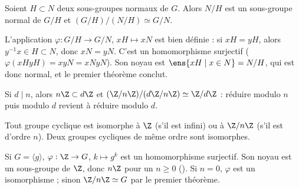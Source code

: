 \begin{theoreme}\label{thm-iso3}
Soient $H\subset N$ deux sous-groupes normaux de $G$. Alors $N/H$ est un sous-groupe normal de $G/H$ et $(G/H)/(N/H)\simeq G/N$.
\end{theoreme}
\begin{preuve}
L'application $\varphi:G/H\to G/N$, $xH\mapsto xN$ est bien définie : si $xH=yH$, alors $y^{-1}x\in H\subset N$, donc $xN=yN$. C'est un homomorphisme surjectif ($\varphi(xHyH)=xyN=xNyN$). Son noyau est $\ens{xH\mid x\in N}=N/H$, qui est donc normal, et le premier théorème conclut.
\end{preuve}
\begin{exemple}
Si $d\mid n$, alors $n\Z\subset d\Z$ et $(\Z/n\Z)/(d\Z/n\Z)\simeq\Z/d\Z$ : réduire modulo $n$ puis modulo $d$ revient à réduire modulo $d$.
\end{exemple}
\begin{theoreme}\label{thm-cycliques}
Tout groupe cyclique est isomorphe à $\Z$ (s'il est infini) ou à $\Z/n\Z$ (s'il est d'ordre $n$). Deux groupes cycliques de même ordre sont isomorphes.
\end{theoreme}
\begin{preuve}
Si $G=\langle g\rangle$, $\varphi:\Z\to G$, $k\mapsto g^k$ est un homomorphisme surjectif. Son noyau est un sous-groupe de $\Z$, donc $n\Z$ pour un $n\ge0$ (). Si $n=0$, $\varphi$ est un isomorphisme ; sinon $\Z/n\Z\simeq G$ par le premier théorème.
\end{preuve}

